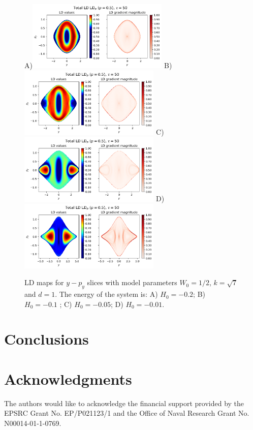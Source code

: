 \documentclass[10pt,aps,onecolumn,superscriptaddress]{revtex4-2}
\begin{document}
\begin{figure}
    \centering
    A)\includegraphics[width=0.6\textwidth]{LD_H0_-0_2_y-py_PES_bifurcation.png}
    B)\includegraphics[width=0.6\textwidth]{LD_H0_-0_1_y-py_PES_bifurcation.png}
    C)\includegraphics[width=0.6\textwidth]{LD_H0_-0_05_y-py_PES_bifurcation.png}
    D)\includegraphics[width=0.6\textwidth]{LD_H0_-0_01_y-py_PES_bifurcation.png}
    \caption{LD maps for $y-p_y$ slices with model parameters $W_0 = 1/2$, $k = \sqrt{7}$ and $d = 1$. The energy of the system is: A) $H_0 = -0.2$; B) $H_0 = -0.1$ ; C) $H_0 = -0.05$; D) $H_0 = -0.01$.}
\end{figure}




\section{Conclusions}
\label{sec:conclusion}

\section*{Acknowledgments}
The authors would like to acknowledge the financial support provided by the EPSRC Grant No. EP/P021123/1 and the Office of Naval Research Grant No. N00014-01-1-0769.


\end{document}
